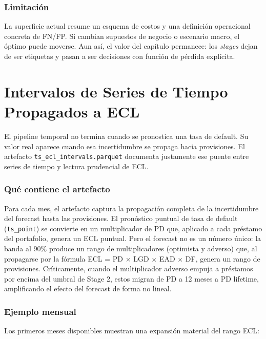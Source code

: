 \documentclass[
  spanish,
  11pt,
  letterpaper,
]{scrbook}
\theoremstyle{plain}
\theoremstyle{remark}
\begin{document}
\subsection{Limitación}\label{limitaciuxf3n-1}

La superficie actual resume un esquema de costos y una definición
operacional concreta de FN/FP. Si cambian supuestos de negocio o
escenario macro, el óptimo puede moverse. Aun así, el valor del capítulo
permanece: los \emph{stages} dejan de ser etiquetas y pasan a ser
decisiones con función de pérdida explícita.

\chapter{Intervalos de Series de Tiempo Propagados a
ECL}\label{sec-ts-ecl}

El pipeline temporal no termina cuando se pronostica una tasa de
default. Su valor real aparece cuando esa incertidumbre se propaga hacia
provisiones. El artefacto \texttt{ts\_ecl\_intervals.parquet} documenta
justamente ese puente entre series de tiempo y lectura prudencial de
ECL.

\subsection{Qué contiene el
artefacto}\label{quuxe9-contiene-el-artefacto}

Para cada mes, el artefacto captura la propagación completa de la
incertidumbre del forecast hasta las provisiones. El pronóstico puntual
de tasa de default (\texttt{ts\_point}) se convierte en un multiplicador
de PD que, aplicado a cada préstamo del portafolio, genera un ECL
puntual. Pero el forecast no es un número único: la banda al 90\%
produce un rango de multiplicadores (optimista y adverso) que, al
propagarse por la fórmula ECL = PD × LGD × EAD × DF, genera un rango de
provisiones. Críticamente, cuando el multiplicador adverso empuja a
préstamos por encima del umbral de Stage 2, estos migran de PD a 12
meses a PD lifetime, amplificando el efecto del forecast de forma no
lineal.

\subsection{Ejemplo mensual}\label{ejemplo-mensual}

Los primeros meses disponibles muestran una expansión material del rango
ECL:
\end{document}
